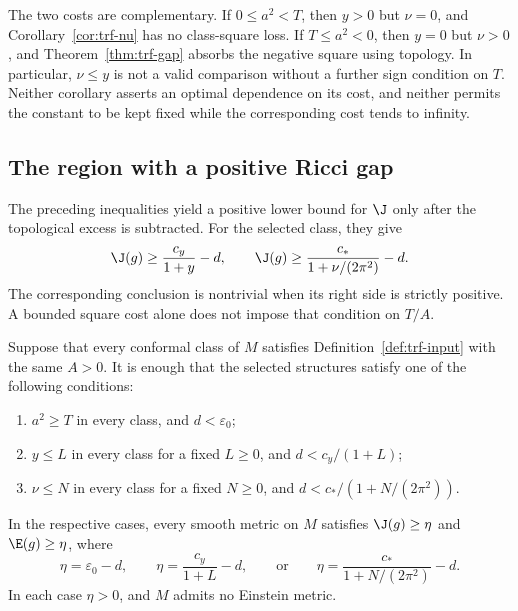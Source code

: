 \begin{remark}
The two costs are complementary.  If $0\le a^2<T$, then $y>0$ but
$\nu=0$, and Corollary~\ref{cor:trf-nu} has no class-square loss.
If $T\le a^2<0$, then $y=0$ but $\nu>0$, and
Theorem~\ref{thm:trf-gap} absorbs the negative square using topology.
In particular, $\nu\le y$ is not a valid comparison without a further
sign condition on $T$.  Neither corollary asserts an optimal dependence
on its cost, and neither permits the constant to be kept fixed while
the corresponding cost tends to infinity.
\end{remark}

\subsection{The region with a positive Ricci gap}

The preceding inequalities yield a positive lower bound for $\J$ only
after the topological excess is subtracted.  For the selected class,
they give
\begin{equation}
 \J(g)\ge\frac{c_y}{1+y}-d,
 \qquad
 \J(g)\ge\frac{c_*}{1+\nu/(2\pi^2)}-d.
 \label{eq:trf-positive-region}
\end{equation}
The corresponding conclusion is nontrivial when its right side is
strictly positive.  A bounded square cost alone does not impose that
condition on $T/A$.

\begin{corollary}
\label{cor:trf-uniform}
Suppose that every conformal class of $M$ satisfies
Definition~\ref{def:trf-input} with the same $A>0$.  It is enough that
the selected structures satisfy one of the following conditions:
\begin{enumerate}
 \item $a^2\ge T$ in every class, and $d<\varepsilon_0$;
 \item $y\le L$ in every class for a fixed $L\ge0$, and
       $d<c_y/(1+L)$;
 \item $\nu\le N$ in every class for a fixed $N\ge0$, and
       $d<c_*/(1+N/(2\pi^2))$.
\end{enumerate}
In the respective cases, every smooth metric on $M$ satisfies
$\J(g)\ge\eta$ and $\E(g)\ge\eta$, where
\[
 \eta=\varepsilon_0-d,\qquad
 \eta=\frac{c_y}{1+L}-d,\qquad\text{or}\qquad
 \eta=\frac{c_*}{1+N/(2\pi^2)}-d.
\]
In each case $\eta>0$, and $M$ admits no Einstein metric.
\end{corollary}

